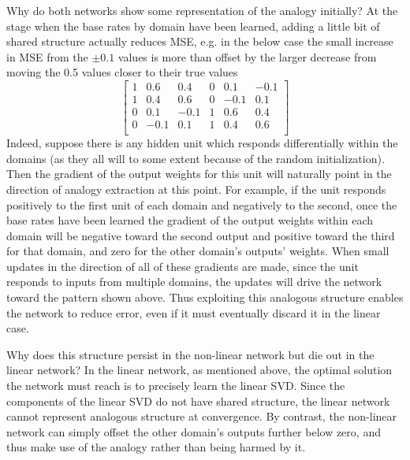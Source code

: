 \documentclass[10pt,letterpaper]{article}
\begin{document}
Why do both networks show some representation of the analogy initially? At the stage when the base rates by domain have been learned, adding a little bit of shared structure actually reduces MSE, e.g. in the below case the small increase in MSE from the \(\pm 0.1\) values is more than offset by the larger decrease from moving the 0.5 values closer to their true values 
{ 
\[
\left[ \begin{matrix} 
1 & 0.6 & 0.4 & 0 & 0.1 & -0.1 \\
1 & 0.4 & 0.6 & 0 & -0.1 & 0.1 \\
0 & 0.1 & -0.1 & 1 & 0.6 & 0.4  \\
0 & -0.1 & 0.1 & 1 & 0.4 & 0.6  \\
\end{matrix}  \right] 
\] 
}
Indeed, suppose there is any hidden unit which responds differentially within the domains (as they all will to some extent because of the random initialization). Then the gradient of the output weights for this unit will naturally point in the direction of analogy extraction at this point. For example, if the unit responds positively to the first unit of each domain and negatively to the second, once the base rates have been learned the gradient of the output weights within each domain will be negative toward the second output and positive toward the third for that domain, and zero for the other domain's outputs' weights. When small updates in the direction of all of these gradients are made, since the unit responds to inputs from multiple domains, the updates will drive the network toward the pattern shown above. Thus exploiting this analogous structure enables the network to reduce error, even if it must eventually discard it in the linear case.  \par
Why does this structure persist in the non-linear network but die out in the linear network? In the linear network, as mentioned above, the optimal solution the network must reach is to precisely learn the linear SVD. Since the components of the linear SVD do not have shared structure, the linear network cannot represent analogous structure at convergence. By contrast, the non-linear network can simply offset the other domain's outputs further below zero, and thus make use of the analogy rather than being harmed by it. 
\end{document}
